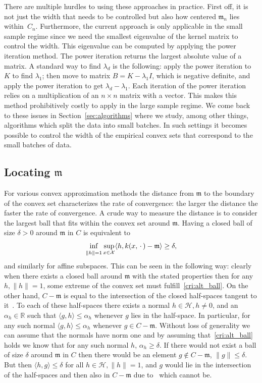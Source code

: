 \documentclass[10pt]{amsart}
\theoremstyle{definition}\newtheorem{defi}[theo]{Definition}\newtheorem{rema}[theo]{Remark}\newtheorem{exam}[theo]{Example}\newtheorem{exem}[theo]{Example}\newtheorem{nota}[theo]{Notation}
\theoremstyle{remark}
\DeclareMathOperator*{\infd}{inf\vphantom{p}}
\newcommand{\R}{\mathbb{R}}
\newcommand{\X}{\mathcal{X}}
\newcommand{\cH}{\mathcal{H}}
\newcommand{\mean}{\mathfrak{m}}
\begin{document}
There are multiple hurdles to using these approaches in practice. First off, it is not just the width that needs to be controlled but also how centered $\mean_n$ lies within~$C_n$. Furthermore, the current approach is only applicable in the small sample regime since we need the smallest eigenvalue of the kernel matrix to control the width. This eigenvalue can be computed by applying the power iteration method. The power iteration returns the largest absolute value of a matrix. A standard way to find $\lambda_d$ is the following: apply the power iteration to $K$ to find $\lambda_1$; then move to matrix $B = K - \lambda_1 I$, which is negative definite, and apply the power iteration to get $\lambda_d - \lambda_1$. Each iteration of the power iteration relies on a multiplication of an $n \times n$ matrix with a vector. This makes this method prohibitively costly to apply in the large sample regime. We come back to these issues in Section~\ref{sec:algorithms} where we study, among other things, algorithms which split the data into small batches. In such settings it becomes possible to control the width of the empirical convex sets that correspond to the small batches of data.



\subsection{Locating \texorpdfstring{$\mean$}{mean}}\label{sec:refinement_location}
For various convex approximation methods the distance from $\mean$ to the boundary of the convex set characterizes the rate of convergence: the larger the distance the faster the rate of convergence. A crude way to measure the distance is to consider the largest ball that fits within the convex set around $\mean$. Having a closed ball of size $\delta>0$ around $\mean$ in $C$ is equivalent to
\begin{equation}\label{cri:alt_ball}
\infd_{\|h\| = 1} \sup_{x \in \X} \langle h, k(x,\,\cdot\,) - \mean \rangle \geq \delta,
\end{equation}
and similarly for affine subspaces. This can be seen in the following way: clearly when there exists a closed ball around $\mean$ with the stated properties then for any $h, \|h\|=1$, some extreme of the convex set must fulfill~\eqref{cri:alt_ball}. On the other hand, $C-\mean$ is equal to the intersection of the closed half-spaces tangent to it~\cite[Theorem~18.8]{ROCK72}. To each of these half-spaces there exists a normal $h \in \cH, h\not =0$, and an $\alpha_h \in \R$ such that $\langle g,h \rangle \leq \alpha_h$ whenever $g$ lies in the half-space. In particular, for any such normal $\langle g,h \rangle \leq \alpha_h$ whenever $g \in C-\mean$. Without loss of generality we can assume that the normals have norm one and by assuming that~\eqref{cri:alt_ball} holds we know that for any such normal $h$, $\alpha_h \geq \delta$. If there would not exist a ball of size $\delta$ around $\mean$ in $C$ then there would be an element $g \not \in C-\mean$, $\|g\| \leq \delta$. But then $\langle h,g \rangle \leq \delta$ for all $h\in \cH, \|h\|=1$, and $g$ would lie in the intersection of the half-spaces and then also in $C - \mean$ due to~\cite[Theorem~18.8]{ROCK72} which cannot be.
\end{document}
